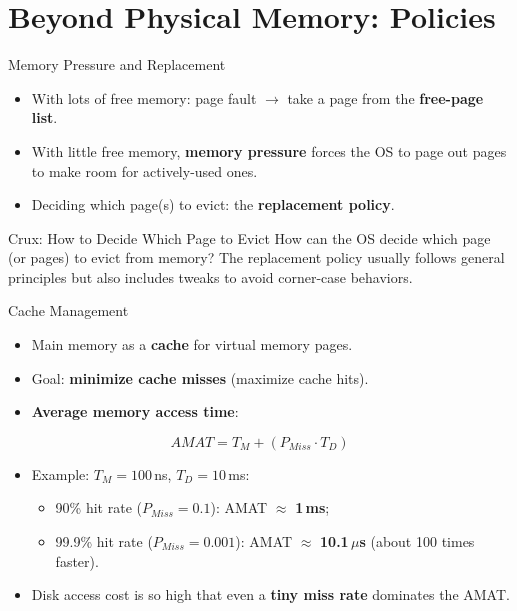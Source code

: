 \section{Beyond Physical Memory: Policies}

\begin{frame}{Memory Pressure and Replacement}

\begin{itemize}
    \item With lots of free memory: page fault $\rightarrow$ take a page from
          the \textbf{free-page list}.
    \item With little free memory, \textbf{memory pressure} forces the OS to
          page out pages to make room for actively-used ones.
    \item Deciding which page(s) to evict: the \textbf{replacement policy}.
\end{itemize}

\begin{block}{Crux: How to Decide Which Page to Evict}
How can the OS decide which page (or pages) to evict from memory? The
replacement policy usually follows general principles but also includes
tweaks to avoid corner-case behaviors.
\end{block}

\end{frame}

\begin{frame}{Cache Management}

\begin{itemize}
    \item Main memory as a \textbf{cache} for virtual memory pages.
    \item Goal: \textbf{minimize cache misses} (maximize cache hits).
    \item \textbf{Average memory access time}:
\end{itemize}

\begin{equation*}
    AMAT = T_M + (P_{Miss} \cdot T_D)
\end{equation*}

\begin{itemize}
    \item Example: $T_M = 100$\,ns, $T_D = 10$\,ms:
    \begin{itemize}
        \item 90\% hit rate ($P_{Miss}=0.1$): AMAT $\approx$ \textbf{1\,ms};
        \item 99.9\% hit rate ($P_{Miss}=0.001$): AMAT $\approx$
              \textbf{10.1\,$\mu$s} (about 100 times faster).
    \end{itemize}
    \item Disk access cost is so high that even a \textbf{tiny miss rate}
          dominates the AMAT.
\end{itemize}

\end{frame}

